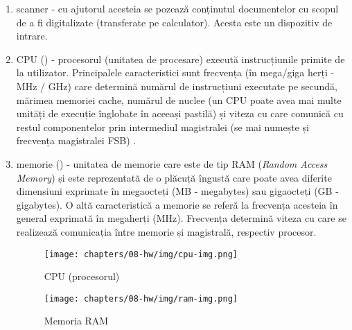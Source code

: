 \begin{enumerate}
  \item scanner - cu ajutorul acesteia se pozează conținutul documentelor
          cu scopul de a fi digitalizate (transferate pe calculator).
          Acesta este un dispozitiv de intrare.
  \item CPU () - procesorul (unitatea de procesare) execută instrucțiunile
          primite de la utilizator. Principalele caracteristici sunt
          frecvența (în mega/giga herți - MHz / GHz) care determină numărul
          de instrucțiuni executate pe secundă, mărimea memoriei cache,
          numărul de nuclee (un CPU poate avea mai multe unități de
          execuție înglobate în aceeași pastilă) și viteza cu care
          comunică cu restul componentelor prin intermediul magistralei
          (se mai numește și frecvența magistralei FSB)
          .

  \item memorie () - unitatea de memorie care este de tip RAM
     (\textit{Random Access Memory}) și
          este reprezentată de o plăcuță îngustă care poate avea diferite
          dimensiuni exprimate în megaocteți (MB -
          megabytes) sau gigaocteți (GB -
          gigabytes). O altă caracteristică a memorie se referă la
          frecvența acesteia în general exprimată în megaherți (MHz). Frecvența determină viteza cu care
          se realizează comunicația între memorie și magistrală, respectiv
          procesor.

\begin{figure}[!htbp]
  \centering
  \texttt{[image: chapters/08-hw/img/cpu-img.png]}
  \caption{CPU (procesorul)\protect\footnotemark}
  \label{fig:hw:cpu}
\end{figure}

\begin{figure}[!htbp]
  \centering
  \texttt{[image: chapters/08-hw/img/ram-img.png]}
  \caption{Memoria RAM\protect\footnotemark}
  \label{fig:hw:ram}
\end{figure}


\end{enumerate}
